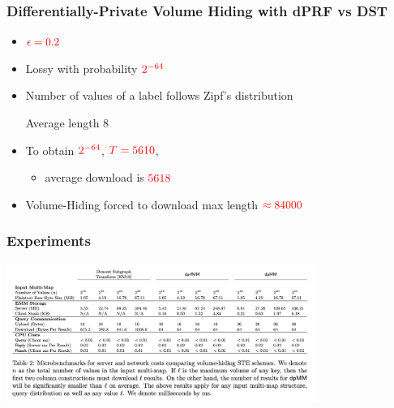 \documentclass[]{beamer}
\begin{document}
\begin{frame}
\frametitle{Differentially-Private Volume Hiding with dPRF vs DST}

\begin{itemize}[<+->]
\item $\color{red} \epsilon=0.2$
\item Lossy with probability $\color{red} 2^{-64}$
\item Number of values of a label follows Zipf's distribution 

        \qquad Average length $8$
\item To obtain $\color{red} 2^{-64}$, $\color{red} T=5610$,

    
    \begin{itemize}
    \item average download is $\color{red} 5618$
    \end{itemize}

\item Volume-Hiding forced to download max length $\color{red} \approx 84000$

\end{itemize}

\end{frame}

\begin{frame}
\frametitle{Experiments}
\begin{center}
\includegraphics[width=4in]{imgs/exp.png}
\end{center}
\end{frame}

\end{document}
